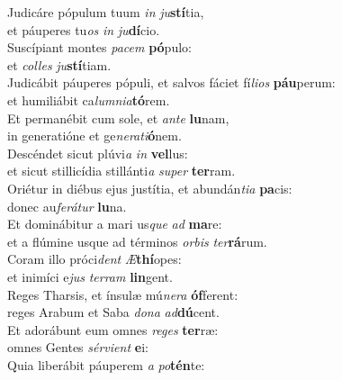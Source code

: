 \evenverse Judicáre pópulum tuum \textit{in} \textit{ju}\textbf{stí}tia,~\*\\
\evenverse et páuperes tu\textit{os} \textit{in} \textit{ju}\textbf{dí}cio.\\
\oddverse Suscípiant montes \textit{pa}\textit{cem} \textbf{pó}pulo:~\*\\
\oddverse et \textit{col}\textit{les} \textit{ju}\textbf{stí}tiam.\\
\evenverse Judicábit páuperes pópuli, et salvos fáciet fí\textit{li}\textit{os} \textbf{páu}perum:~\*\\
\evenverse et humiliábit ca\textit{lum}\textit{ni}\textit{a}\textbf{tó}rem.\\
\oddverse Et permanébit cum sole, et \textit{an}\textit{te} \textbf{lu}nam,~\*\\
\oddverse in generatióne et ge\textit{ne}\textit{ra}\textit{ti}\textbf{ó}nem.\\
\evenverse Descéndet sicut plúvi\textit{a} \textit{in} \textbf{vel}lus:~\*\\
\evenverse et sicut stillicídia stillánti\textit{a} \textit{su}\textit{per} \textbf{ter}ram.\\
\oddverse Oriétur in diébus ejus justítia, et abundán\textit{ti}\textit{a} \textbf{pa}cis:~\*\\
\oddverse donec au\textit{fe}\textit{rá}\textit{tur} \textbf{lu}na.\\
\evenverse Et dominábitur a mari us\textit{que} \textit{ad} \textbf{ma}re:~\*\\
\evenverse et a flúmine usque ad términos \textit{or}\textit{bis} \textit{ter}\textbf{rá}rum.\\
\oddverse Coram illo próci\textit{dent} \textit{Æ}\textbf{thí}opes:~\*\\
\oddverse et inimíci e\textit{jus} \textit{ter}\textit{ram} \textbf{lin}gent.\\
\evenverse Reges Tharsis, et ínsulæ mú\textit{ne}\textit{ra} \textbf{óf}ferent:~\*\\
\evenverse reges Arabum et Saba \textit{do}\textit{na} \textit{ad}\textbf{dú}cent.\\
\oddverse Et adorábunt eum omnes \textit{re}\textit{ges} \textbf{ter}ræ:~\*\\
\oddverse omnes Gentes \textit{sér}\textit{vi}\textit{ent} \textbf{e}i:\\
\evenverse Quia liberábit páuperem \textit{a} \textit{po}\textbf{tén}te:~\*\\
